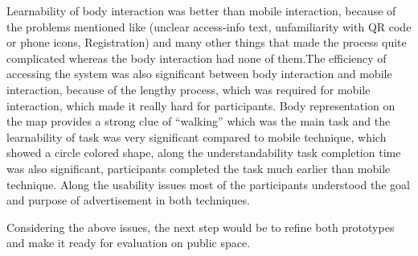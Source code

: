 Learnability of body interaction was better than mobile interaction, because of the problems mentioned like (unclear access-info text, unfamiliarity with QR code or phone icons, Registration) and many other things that made the process quite complicated whereas the body interaction had none of them.The efficiency of accessing the system was also significant between body interaction and mobile interaction, because of the lengthy process, which was required for mobile interaction, which made it really hard for participants.
Body representation on the map provides a strong clue of “walking” which was the main task and the learnability of task was very significant compared to mobile technique, which showed a circle colored shape, along the understandability task completion time was also significant, participants completed the task much earlier than mobile technique. 
Along the usability issues most of the participants understood the goal and purpose of advertisement in both techniques.

Considering the above issues, the next step would be to refine both prototypes and make it ready for evaluation on public space.













